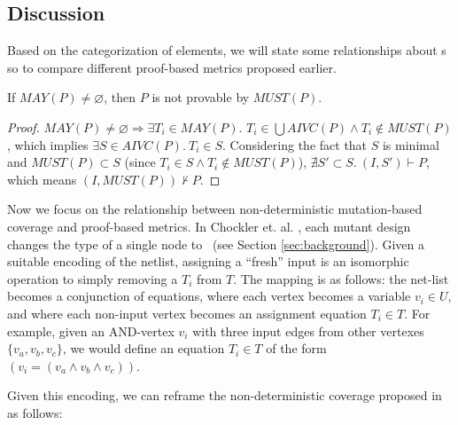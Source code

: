 \subsection{Discussion}
\label{subsec:method-disc}


Based on the categorization of elements, we will state some relationships about \mivc s so to compare different proof-based metrics proposed earlier.

\begin{lemma}
  \label{lem:must-not-enough}
  If $MAY(P) \neq \varnothing$, then $P$ is not provable by $MUST(P)$.
\end{lemma}
\begin{proof}
  $MAY(P) \neq \varnothing \Rightarrow  \exists T_i \in MAY(P).$
$T_i \in \bigcup AIVC(P) \wedge T_i \notin MUST(P)$,
which implies $\exists S \in AIVC(P).~ T_i \in S$.
Considering the fact that $S$ is minimal and
$MUST(P) \subset S$ (since $T_i \in S \wedge T_i \notin MUST(P)$),
 $\nexists S' \subset S.~ (I,S') \vdash P$,  which means $(I, MUST(P)) \nvdash P$.
\end{proof}
\vspace{2mm}


Now we focus on the relationship between non-deterministic mutation-based coverage and proof-based metrics. In Chockler et. al. \cite{chockler2010coverage}, each mutant design changes the type of a single node to \ (see Section \ref{sec:background}).
Given a suitable encoding of the netlist, assigning a ``fresh'' input is an isomorphic operation to simply removing a $T_i$ from $T$. The mapping is as follows: the net-list becomes a conjunction
of equations, where each vertex becomes a variable $v_i \in U$, and where each non-input vertex becomes an assignment equation $T_i \in T$.
For example, given an AND-vertex $v_i$ with three input edges from other vertexes $\{v_a, v_b, v_c\}$, we would define an equation $T_i \in T$ of the form $(v_i = (v_a \wedge v_b \wedge v_c))$.
%

Given this encoding, we can reframe the non-deterministic coverage proposed in \cite{chockler2010coverage} as follows:

